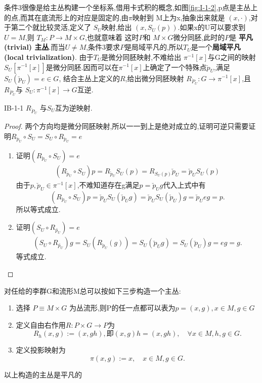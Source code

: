 \documentclass[../main.tex]{subfiles}
\begin{document}
 条件3很像是给主丛构建一个坐标系,借用卡式积的概念,如图\ref{fig:I-1-2},p点是主丛上的点,而其在底流形上的对应是固定的,由$\pi$映射到
 M上为x,抽象出来就是 $(x,\cdot)$,对于第二个就比较灵活,定义了 $S_U$映射,给出 $(x,S_U(p))$.如果x的U可以要求到$U = M$,则 $T_M : P \to M \times G$,也就意味着
 这时$P$和 $M\times G$微分同胚,此时的$P$是 \textbf{平凡(trivial) 主丛}.而当$U \neq M$,条件3要求$P$是局域平凡的,所以$T_U$是一个\textbf{局域平凡(local trivialization)}.
 由于$T_U$是微分同胚映射,不难给出 $\pi^{-1}[x]$与G之间的映射$S_U[\pi^{-1}[x]]$是微分同胚.因而可以在$\pi^{-1}[x]$上确定了一个特殊点$\breve{p}_U$,满足 $S_U(\breve{p}_U) = e \in G$, 结合主丛上定义的$R$,给出微分同胚映射 $R_{\breve{P}_U} : G \to \pi^{-1}[x]$,且$R_{\breve{P}_U}$与 $S_U:\pi^{-1}[x] \to G$互逆.
 \begin{theorem}
 {}{IB-1-1}
 $R_{\breve{P}_U}$ 与$S_U$互为逆映射.
 \end{theorem}
 \begin{proof}
 两个方向均是微分同胚映射,所以一一到上是绝对成立的,证明可逆只需要证明$R_{\breve{p}_U}\circ S_U = S_U\circ R_{\breve{p}_U} = e$
 \begin{enumerate}
 \item 证明$(R_{\breve{p}_U} \circ S_U) = e$
   \begin{align*}
 (R_{\breve{p}_U} \circ S_U)p = R_{\breve{p}_U}S_U(p) = R_{S_U(p)}\breve{p}_U  = \breve{p}_U S_U(p)  
 \end{align*}
 由于$p,\breve{p}_U \in  \pi^{-1}[x]$,不难知道存在g满足$p = \breve{p}_U g$代入上式中有 \[
 (R_{\breve{p}_U} \circ S_U)p = \breve{p}_U S_U(\breve{p}_U g) = \breve{p}_U S_U(\breve{p}_U)g = \breve{p}_Ueg = p
 .\] 
 所以等式成立.
 \item 证明$(S_U \circ R_{\breve{p_U}}) = e$
 \begin{align*}
   (S_U \circ R_{\breve{p_U}}) g =S_U(R_{\breve{p}_U}(g)) = S_U(\breve{p}_U g) = S_U(\breve{p}_U)g = eg = g 
 .\end{align*}
 等式成立.
 \end{enumerate}
 \end{proof}
 \begin{example}
 \label{ex:I-1-1}
 对任给的李群G和流形M总可以按如下三步构造一个主丛:
 \begin{enumerate}
   \item 选择 $P \equiv M \times G$ 为丛流形,则P的任一点都可以表为$p = (x,g),x \in M, g \in G$ 
   \item 定义自由右作用$R: P \times G \to  P$为\[
       R_h(x,g) := (x,gh),\text{即}(x,g)h = (x,gh),\quad \forall x \in  M , h,g \in G  
   .\] 
 \item 定义投影映射为\[
\pi(x,g):= x, \quad x\in M,g\in G 
 .\] 
 \end{enumerate}
 以上构造的主丛是平凡的
 \end{example}
\end{document}
